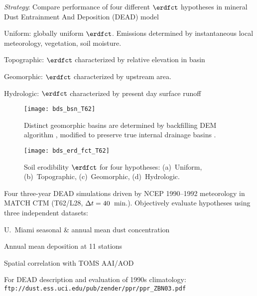 \documentclass[final,dvips]{foils}
\begin{document}
\rotatefoilhead{\bgl
\Large\textcolor{blue}{\hfill Strategy \hfill}}\vspace{-0.5in}\large
\textit{Strategy}:
Compare performance of four different $\erdfct$
hypotheses in mineral Dust Entrainment And Deposition (DEAD) model
\begin{itemize*}
\item Uniform: globally uniform $\erdfct$. 
  Emissions determined by instantaneous local meteorology, vegetation,
  soil moisture.   
\item Topographic: $\erdfct$ characterized by relative elevation in basin \cite[]{GCT01} 
\item Geomorphic: $\erdfct$ characterized by upstream area.
\item Hydrologic: $\erdfct$ characterized by present day surface runoff
\end{itemize*}

\rotatefoilhead{\bgl
\Large\textcolor{blue}{\hfill Geomorphic Basins \hfill}}\vspace{-0.5in}\large
\begin{figure}[!h]
\centering %
\texttt{[image: bds\_bsn\_T62]}\vfill
\caption{
Distinct geomorphic basins are determined by backfilling DEM algorithm 
\cite[]{JeD88}, modified to preserve true internal drainage basins
\cite[]{Asa00}. 
\label{fgr:bds_bsn_T62}}
\end{figure}

\rotatefoilhead{\bgl
\Large\textcolor{blue}{\hfill Soil Erodibility \hfill}}\vspace{-0.5in}\large
\begin{figure}[!h]
\centering %
\texttt{[image: bds\_erd\_fct\_T62]}\vfill
\caption{
Soil erodibility $\erdfct$ for four hypotheses:
(a)~Uniform, (b)~Topographic, 
(c)~Geomorphic, (d)~Hydrologic.
\label{fgr:mbl_bsn_fct}}
\end{figure}

\rotatefoilhead{\bgl
\Large\textcolor{blue}{\hfill Methods \hfill}}\vspace{-0.5in}\large
Four three-year DEAD simulations driven by NCEP 1990--1992 meteorology  
 in MATCH CTM \cite[]{RME97} 
(T62/L28, $\Delta t = 40$~min.).
Objectively evaluate hypotheses using three independent datasets: 
\begin{itemize*}
\item U.~Miami seasonal \& annual mean dust concentration
\item Annual mean deposition at 11 stations \cite[]{GCT01}
\item Spatial correlation with TOMS AAI/AOD \cite[]{TBH98}
\end{itemize*}
For DEAD description and evaluation of 1990s climatology:
\texttt{\normalsize{ftp://dust.ess.uci.edu/pub/zender/ppr/ppr\_ZBN03.pdf}}
\end{document}
